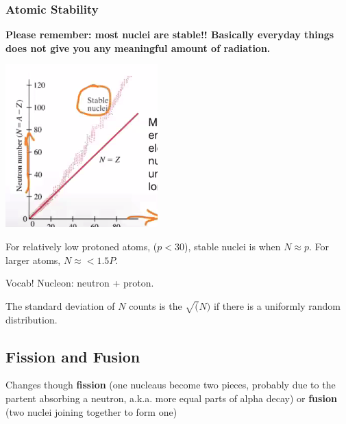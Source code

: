 \documentclass[letterpaper]{article}
\begin{document}
\subsubsection{Atomic Stability}
\label{sec:org8280e15}
\textbf{Please remember: most nuclei are stable!! Basically everyday things
does not give you any meaningful amount of radiation.}

\begin{center}
\includegraphics[width=.9\linewidth]{stablenuclei.png}
\end{center}

For relatively low protoned atoms, (\(p < 30\)), stable nuclei is when
\(N \approx p\). For larger atoms, \(N \approx < 1.5P\).

Vocab! Nucleon: neutron + proton.

The standard deviation of \(N\) counts is the \(\sqrt(N)\) if there is a
uniformly random distribution.

\subsection{Fission and Fusion}
\label{sec:org32c0b5f}
Changes though \textbf{fission} (one nucleaus become two pieces, probably due
to the partent absorbing a neutron, a.k.a. more equal parts of alpha
decay) or \textbf{fusion} (two nuclei joining together to form one)
\end{document}
